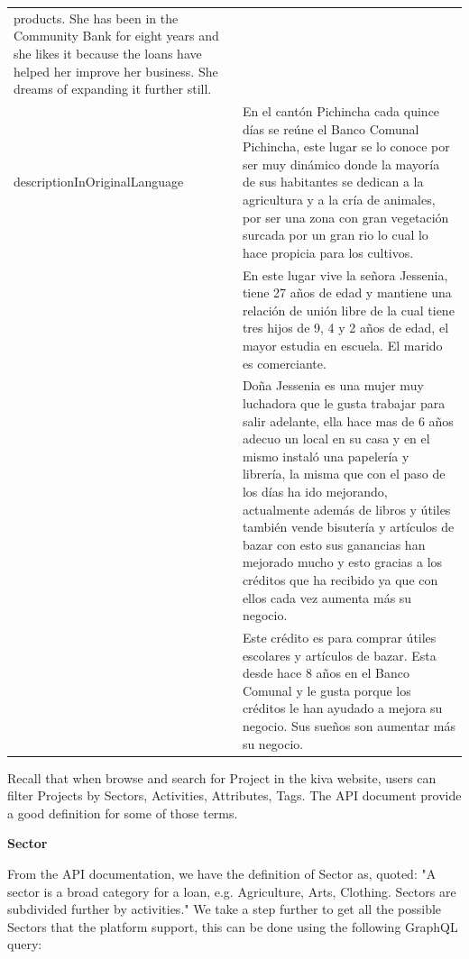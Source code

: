 \begin{longtable}{|p{}|p{}|}
	products. She has been in the Community Bank for eight years and she
	likes it because the loans have helped her improve her business. She
	dreams of expanding it further still.                                                                      \\
	descriptionInOriginalLanguage        & En el cantón Pichincha cada quince días
	se reúne el Banco Comunal Pichincha, este lugar se lo conoce por ser muy
	dinámico donde la mayoría de sus habitantes se dedican a la agricultura
	y a la cría de animales, por ser una zona con gran vegetación surcada
	por un gran rio lo cual lo hace propicia para los cultivos.                                                \\
	                                     & En este lugar vive la señora Jessenia, tiene 27 años de edad y
	mantiene una relación de unión libre de la cual tiene tres hijos de 9, 4
	y 2 años de edad, el mayor estudia en escuela. El marido es
	comerciante.                                                                                               \\
	                                     & Doña Jessenia es una mujer muy luchadora que le gusta trabajar para
	salir adelante, ella hace mas de 6 años adecuo un local en su casa y en
	el mismo instaló una papelería y librería, la misma que con el paso de
	los días ha ido mejorando, actualmente además de libros y útiles también
	vende bisutería y artículos de bazar con esto sus ganancias han mejorado
	mucho y esto gracias a los créditos que ha recibido ya que con ellos
	cada vez aumenta más su negocio.                                                                           \\
	                                     & Este crédito es para comprar útiles escolares y artículos de bazar.
	Esta desde hace 8 años en el Banco Comunal y le gusta porque los
	créditos le han ayudado a mejora su negocio. Sus sueños son aumentar más
	su negocio.                                                                                                \\
\end{longtable}

Recall that when browse and search for Project in the kiva website,
users can filter Projects by Sectors, Activities, Attributes, Tags.
The API document provide a good definition for some of those terms.

\textbf{Sector}

From the API documentation, we have the definition of Sector as, quoted:
"A sector is a broad category for a loan, e.g. Agriculture, Arts, Clothing. Sectors are subdivided further by activities."
We take a step further to get all the possible Sectors that the platform support,
this can be done using the following GraphQL query:

